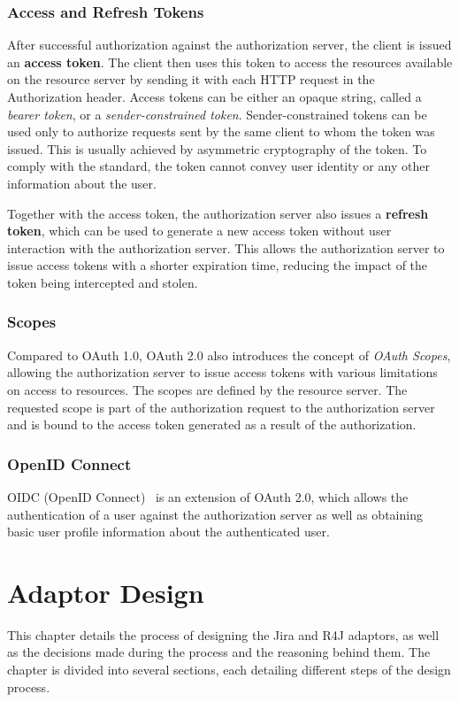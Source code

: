 \subsection*{Access and Refresh Tokens}
After successful authorization against the authorization server, the client is issued an \textbf{access token}. The client then uses this token to access the resources available on the resource server by sending it with each HTTP request in the Authorization header. Access tokens can be either an opaque string, called a \emph{bearer token}, or a \emph{sender-constrained token}. Sender-constrained tokens can be used only to authorize requests sent by the same client to whom the token was issued. This is usually achieved by asymmetric cryptography of the token. To comply with the standard, the token cannot convey user identity or any other information about the user.

Together with the access token, the authorization server also issues a \textbf{refresh token}, which can be used to generate a new access token without user interaction with the authorization server. This allows the authorization server to issue access tokens with a shorter expiration time, reducing the impact of the token being intercepted and stolen.

\subsection*{Scopes}
Compared to OAuth 1.0, OAuth 2.0 also introduces the concept of \emph{OAuth Scopes}, allowing the authorization server to issue access tokens with various limitations on access to resources. The scopes are defined by the resource server. The requested scope is part of the authorization request to the authorization server and is bound to the access token generated as a result of the authorization.

\subsection*{OpenID Connect}
OIDC (OpenID Connect) \cite{oidc} is an extension of OAuth 2.0, which allows the authentication of a user against the authorization server as well as obtaining basic user profile information about the authenticated user.


\chapter{Adaptor Design}
\label{chapter:adaptor_design}
This chapter details the process of designing the Jira and R4J adaptors, as well as the decisions made during the process and the reasoning behind them. The chapter is divided into several sections, each detailing different steps of the design process.

